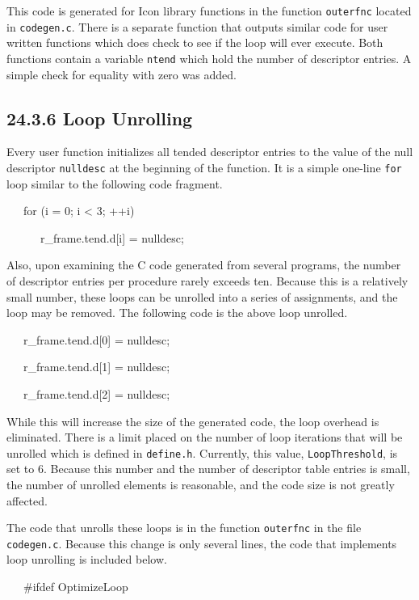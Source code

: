 This code is generated for Icon library functions in the function
\texttt{outerfnc} located in \texttt{codegen.c}. There is a separate
function that outputs similar code for user written functions which
does check to see if the loop will ever execute. Both functions
contain a variable \texttt{ntend} which hold the number of descriptor
entries. A simple check for equality with zero was added.

\subsection[24.3.6 Loop Unrolling]{24.3.6 Loop Unrolling}

Every user function initializes all tended descriptor entries to the
value of the null descriptor \texttt{nulldesc} at the beginning of the
function. It is a simple one-line \texttt{for} loop similar to the
following code fragment.

{\ttfamily\mdseries
\ \ \ for (i = 0; i {\textless} 3; ++i)}

{\ttfamily\mdseries
\ \ \ \ \ \ r\_frame.tend.d[i] = nulldesc;}


Also, upon examining the C code generated from several programs, the
number of descriptor entries per procedure rarely exceeds ten. Because
this is a relatively small number, these loops can be unrolled into a
series of assignments, and the loop may be removed. The following code
is the above loop unrolled.

{\ttfamily\mdseries
\ \ \ r\_frame.tend.d[0] = nulldesc;}

{\ttfamily\mdseries
\ \ \ r\_frame.tend.d[1] = nulldesc;}

{\ttfamily\mdseries
\ \ \ r\_frame.tend.d[2] = nulldesc;}


While this will increase the size of the generated code, the loop
overhead is eliminated. There is a limit placed on the number of loop
iterations that will be unrolled which is defined in
\texttt{define.h}. Currently, this value, \texttt{LoopThreshold}, is
set to 6. Because this number and the number of descriptor table
entries is small, the number of unrolled elements is reasonable, and
the code size is not greatly affected.


The code that unrolls these loops is in the function \texttt{outerfnc}
in the file \texttt{codegen.c}. Because this change is only several
lines, the code that implements loop unrolling is included below.

{\ttfamily\mdseries
\ \ \ \#ifdef OptimizeLoop}

